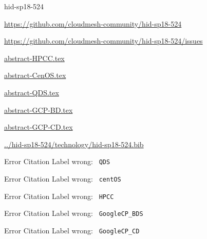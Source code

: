 \begin{IU}

hid-sp18-524

\url{https://github.com/cloudmesh-community/hid-sp18-524}

\url{https://github.com/cloudmesh-community/hid-sp18-524/issues}

\href{https://github.com/cloudmesh-community/hid-sp18-524/blob/master//technology/abstract-HPCC.tex}{abstract-HPCC.tex}

\href{https://github.com/cloudmesh-community/hid-sp18-524/blob/master//technology/abstract-CenOS.tex}{abstract-CenOS.tex}

\href{https://github.com/cloudmesh-community/hid-sp18-524/blob/master//technology/abstract-QDS.tex}{abstract-QDS.tex}

\href{https://github.com/cloudmesh-community/hid-sp18-524/blob/master//technology/abstract-GCP-BD.tex}{abstract-GCP-BD.tex}

\href{https://github.com/cloudmesh-community/hid-sp18-524/blob/master//technology/abstract-GCP-CD.tex}{abstract-GCP-CD.tex}

\href{https://github.com/cloudmesh-community/hid-sp18-524/blob/master//technology/hid-sp18-524.bib}{../hid-sp18-524/technology/hid-sp18-524.bib}

 Error Citation Label wrong: \verb| QDS |

 Error Citation Label wrong: \verb| centOS |

 Error Citation Label wrong: \verb| HPCC |

 Error Citation Label wrong: \verb| GoogleCP_BDS |

 Error Citation Label wrong: \verb| GoogleCP_CD |

\end{IU}


